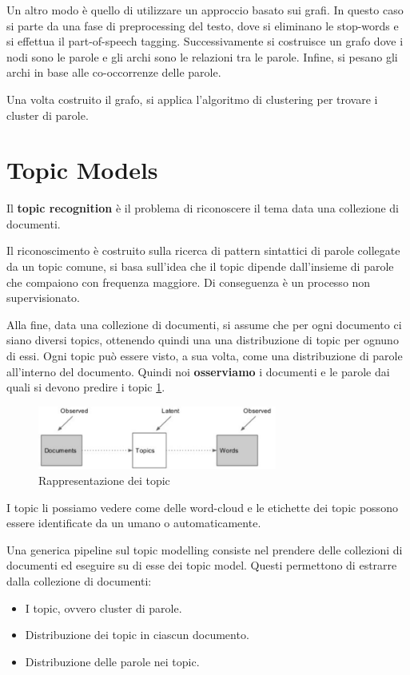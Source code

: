 Un altro modo è quello di utilizzare un approccio basato sui grafi. In questo caso
si parte da una fase di preprocessing del testo, dove si eliminano le stop-words
e si effettua il part-of-speech tagging. Successivamente si costruisce un grafo
dove i nodi sono le parole e gli archi sono le relazioni tra le parole. Infine,
si pesano gli archi in base alle co-occorrenze delle parole.

Una volta costruito il grafo, si applica l'algoritmo di clustering per trovare
i cluster di parole. 
\section{Topic Models}
\begin{definizione}
      Il \textbf{topic recognition} è il problema di riconoscere il tema data una
      collezione di documenti.
\end{definizione}

Il riconoscimento è costruito sulla ricerca di pattern sintattici di parole collegate
da un topic comune, si basa sull'idea che il topic dipende dall'insieme di parole
che compaiono con frequenza maggiore. Di conseguenza è un processo non supervisionato.

Alla fine, data una collezione di documenti, si assume che per ogni documento ci
siano diversi topics, ottenendo quindi una una distribuzione di topic per ognuno
di essi. Ogni topic può essere visto, a sua volta, come una distribuzione di parole
all'interno del documento. Quindi noi \textbf{osserviamo} i documenti e le parole
dai quali si devono predire i topic \ref{fig:topic}.
\begin{figure}[!ht]
      \centering
      \includegraphics[width=0.7\textwidth]{img/nlp/topic_model.png}
      \caption{Rappresentazione dei topic}
      \label{fig:topic}
\end{figure}
\begin{nota}
      I topic li possiamo vedere come delle word-cloud e le etichette dei topic
      possono essere identificate da un umano o automaticamente.
\end{nota}
Una generica pipeline sul topic modelling consiste nel prendere delle collezioni
di documenti ed eseguire su di esse dei topic model. Questi permettono di
estrarre dalla collezione di documenti:
\begin{itemize}
      \item I topic, ovvero cluster di parole.
      \item Distribuzione dei topic in ciascun documento.
      \item Distribuzione delle parole nei topic.
\end{itemize}

